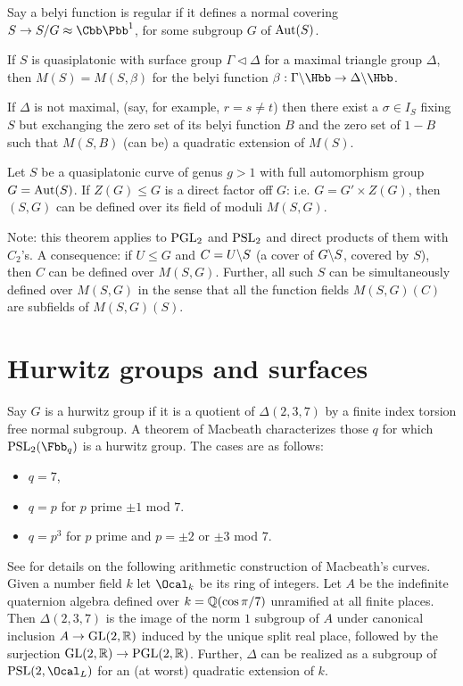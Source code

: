 \documentclass[11pt]{amsart}
\newcommand{\CPone}{\Cbb \Pbb^1}
\begin{document}
Say a belyi function is regular if it defines a normal covering $S\to S/G\approx \CPone$, for some subgroup $G$ of $\operatorname{Aut}(S)$.

\begin{lemma}
	If $S$ is quasiplatonic with surface group $\Gamma \triangleleft \Delta$ for a maximal triangle group $\Delta$, then $M(S)=M(S,\beta)$ for the belyi function $\beta:\Gamma \lmod \Hbb \to \Delta \lmod \Hbb$.
\end{lemma}

If $\Delta$ is not maximal, (say, for example, $r=s \neq t$) then there exist a $\sigma \in I_S$ fixing $S$ but exchanging the zero set of its belyi function $B$ and the zero set of $1-B$ such that $M(S,B)$ (can be) a quadratic extension of $M(S)$.

\begin{thm}
	Let $S$ be a quasiplatonic curve of genus $g>1$ with full automorphism group $G=\operatorname{Aut}(S)$. If $Z(G)\leq G$ is a direct factor off $G$: i.e. $G=G'\times Z(G)$, then $(S,G)$ can be defined over its field of moduli $M(S,G)$.
\end{thm}

Note: this theorem applies to $\operatorname{PGL}_2$ and $\operatorname{PSL}_2$ and direct products of them with $C_2$'s. A consequence: if $U\leq G$ and $C=U\backslash S$ (a cover of $G\backslash S$, covered by $S$), then $C$ can be defined over $M(S,G)$. Further, all such $S$ can be simultaneously defined over $M(S,G)$ in the sense that all the function fields $M(S,G)(C)$ are subfields of $M(S,G)(S)$.

\section*{Hurwitz groups and surfaces}
Say $G$ is a hurwitz group if it is a quotient of $\Delta(2,3,7)$ by a finite index torsion free normal subgroup. A theorem of Macbeath characterizes those $q$ for which $\PSL_2(\Fbb_q)$ is a hurwitz group. The cases are as follows:
\begin{itemize}
	\item $q=7$,
	\item $q=p$ for $p$ prime $\pm 1$ mod $7$.
	\item $q=p^3$ for $p$ prime and $p= \pm 2$ or $\pm 3$ mod $7$.
\end{itemize}

See \cite{dzambicMacbeathsInfiniteSeries2007} for details on the following arithmetic construction of Macbeath's curves. Given a number field $k$ let $\Ocal_k$ be its ring of integers. Let $A$ be the indefinite quaternion algebra defined over $k=\mathbb{Q}(\cos\pi/7)$ unramified at all finite places. Then $\Delta(2,3,7)$ is the image of the norm $1$ subgroup of $A$ under canonical inclusion $A \to \operatorname{GL}(2,\mathbb{R})$ induced by the unique split real place, followed by the surjection $\operatorname{GL}(2,\mathbb{R}) \to \operatorname{PGL}(2,\mathbb{R})$. Further, $\Delta$ can be realized as a subgroup of $\PSL(2,\Ocal_L)$ for an (at worst) quadratic extension of $k$.
\end{document}
